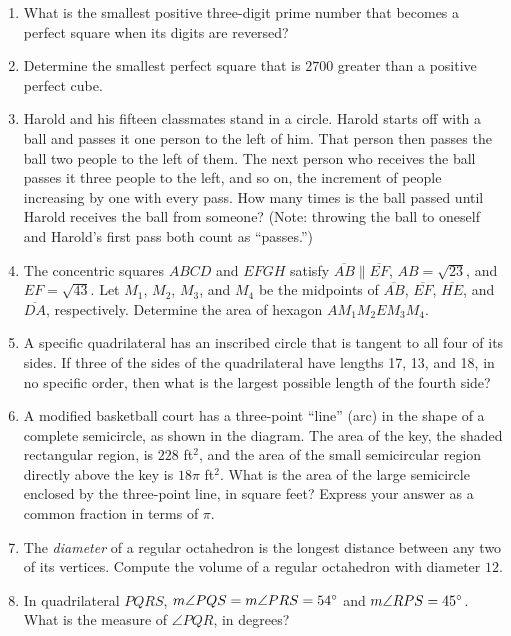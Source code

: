 \documentclass[11pt]{article}
\begin{document}
\begin{enumerate}[1.]
			\item What is the smallest positive three-digit prime number that becomes a perfect square when its digits are reversed?
			
			\item Determine the smallest perfect square that is $2700$ greater than a positive perfect cube.
			
			\item Harold and his fifteen classmates stand in a circle. Harold starts off with a ball and passes it one person to the left of him. That person then passes the ball two people to the left of them. The next person who receives the ball passes it three people to the left, and so on, the increment of people increasing by one with every pass. How many times is the ball passed until Harold receives the ball from someone? (Note: throwing the ball to oneself and Harold's first pass both count as ``passes.'')
			
			\item The concentric squares $ABCD$ and $EFGH$ satisfy $\overline{AB} \parallel \overline{EF}$, $AB = \sqrt{23}$, and $EF = \sqrt{43}$. Let $M_1$, $M_2$, $M_3$, and $M_4$ be the midpoints of $\overline{AB}$, $\overline{EF}$, $\overline{HE}$, and $\overline{DA}$, respectively. Determine the area of hexagon $AM_1M_2EM_3M_4$.
			
			\item A specific quadrilateral has an inscribed circle that is tangent to all four of its sides. If three of the sides of the quadrilateral have lengths 17, 13, and 18, in no specific order, then what is the largest possible length of the fourth side?
			
			\item A modified basketball court has a three-point ``line'' (arc) in the shape of a complete semicircle, as shown in the diagram. The area of the key, the shaded rectangular region, is $228$ ft$^2$, and the area of the small semicircular region directly above the key is $18\pi$ ft$^2$. What is the area of the large semicircle enclosed by the three-point line, in square feet? Express your answer as a common fraction in terms of $\pi$.
			
			\item The \textit{diameter} of a regular octahedron is the longest distance between any two of its vertices. Compute the volume of a regular octahedron with diameter $12$.
			
			\item In quadrilateral $PQRS$, $m\angle PQS = m\angle PRS = 54\degree$ and $m\angle RPS = 45\degree$. What is the measure of $\angle PQR$, in degrees?
			

\end{enumerate}
\end{document}

